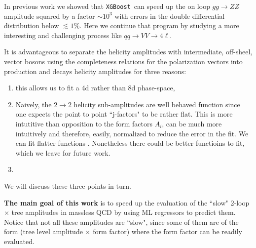 \documentclass[aps,prl,twocolumn,superscriptaddress,amsfont,graphicx,preprintnumbers]{revtex4-1}
\newcommand{\xgb}{\texttt{XGBoost}~}
\newcommand{\red}[1]{{\color{Red}{#1}}}
\begin{document}
In previous work \cite{Bishara:2019iwh} we showed that \xgb can speed up the on loop $gg \to ZZ$ amplitude squared by a factor $\sim 10^3$ with errors in the double differential distribution below $\lesssim 1 \%$. Here we continue that program by studying a more interesting and challenging process like $q q \to VV \to 4 \ell$.

It is advantageous to separate the helicity amplitudes with intermediate, off-sheel, vector bosons using the completeness relations for the polarization vectors into production and decays helicity amplitudes for three reasons:
\begin{enumerate}
    \item this allows us to fit a 4d rather than 8d phase-space,
   \item Naively, the  $2 \to 2$ helicity sub-amplitudes are well behaved function since one expects the point to point ``j-factors" to be rather flat. This is more intutitive than opposition to the form factors $A_i$, can be much more intuitively and therefore, easily, normalized to reduce the error in the fit. We can fit flatter functions 
   \red{(we should plot the ratios, aka the helicity amplitude ``j-factors" for helamps, and also for the A's (in the Appendix / supplemental material)}. Nonetheless there could be better functioins to fit, which we leave for future work.
   
   \item \red{Anything else?}
   
\end{enumerate}
We will discuss these three points in turn.
\medskip

{\bf The main goal of this work} is to speed up the evaluation of the ``slow" 2-loop $\times$ tree amplitudes in massless QCD by using ML regressors to predict them. Notice that not all these amplitudes are ``slow", since some of them are of the form (tree level amplitude $\times$ form factor) where the form factor can be readily evaluated.
\end{document}
